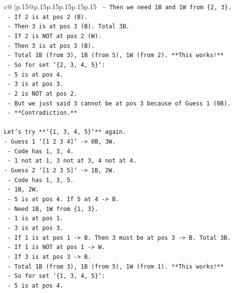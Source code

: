 \documentclass{article}
\begin{document}
{\begin{supertabular}{c@{$\;$}|p{.15\linewidth}@{}p{.15\linewidth}p{.15\linewidth}p{.15\linewidth}p{.15\linewidth}p{.15\linewidth}}
{{{\texttt{    {-} Then we need 1B and 1W from \{2, 3\}.} \\
\texttt{    {-} If 2 is at pos 2 (B).} \\
\texttt{    {-} Then 3 is at pos 3 (B). Total 3B.} \\
\texttt{    {-} If 2 is NOT at pos 2 (W).} \\
\texttt{    {-} Then 3 is at pos 3 (B).} \\
\texttt{    {-} Total 1B (from 3), 1B (from 5), 1W (from 2). **This works!**} \\
\texttt{    {-} So for set `\{2, 3, 4, 5\}`:} \\
\texttt{      {-} 5 is at pos 4.} \\
\texttt{      {-} 3 is at pos 3.} \\
\texttt{      {-} 2 is NOT at pos 2.} \\
\texttt{      {-} But we just said 3 cannot be at pos 3 because of Guess 1 (0B).} \\
\texttt{      {-} **Contradiction.**} \\
\\ 
\texttt{Let's try **`\{1, 3, 4, 5\}`** again.} \\
\texttt{{-} Guess 1 `{[}1 2 3 4{]}` {-}> 0B, 3W.} \\
\texttt{  {-} Code has 1, 3, 4.} \\
\texttt{  {-} 1 not at 1, 3 not at 3, 4 not at 4.} \\
\texttt{{-} Guess 2 `{[}1 2 3 5{]}` {-}> 1B, 2W.} \\
\texttt{  {-} Code has 1, 3, 5.} \\
\texttt{  {-} 1B, 2W.} \\
\texttt{  {-} 5 is at pos 4. If 5 at 4 {-}> B.} \\
\texttt{  {-} Need 1B, 1W from \{1, 3\}.} \\
\texttt{  {-} 1 is at pos 1.} \\
\texttt{  {-} 3 is at pos 3.} \\
\texttt{  {-} If 1 is at pos 1 {-}> B. Then 3 must be at pos 3 {-}> B. Total 3B.} \\
\texttt{  {-} If 1 is NOT at pos 1 {-}> W.} \\
\texttt{  {-} If 3 is at pos 3 {-}> B.} \\
\texttt{  {-} Total 1B (from 3), 1B (from 5), 1W (from 1). **This works!**} \\
\texttt{  {-} So for set `\{1, 3, 4, 5\}`:} \\
\texttt{    {-} 5 is at pos 4.} \\
}}}
\end{supertabular}}
\end{document}
